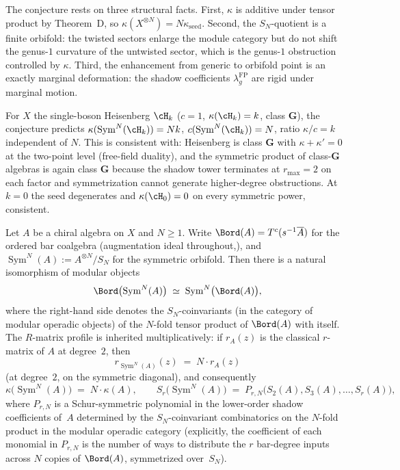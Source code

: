 \begin{remark}
\label{rem:orbifold-agreement-motivation}
The conjecture rests on three structural facts. First,
$\kappa$ is additive under tensor product by Theorem~D, so
$\kappa(X^{\otimes N}) = N \kappa_{\mathrm{seed}}$. Second,
the $S_N$-quotient is a finite orbifold: the twisted sectors
enlarge the module category but do not shift the
genus-$1$ curvature of the untwisted sector, which is the
genus-$1$ obstruction controlled by $\kappa$. Third, the
enhancement from generic to orbifold point is an exactly
marginal deformation: the shadow coefficients
$\lambda_g^{\mathrm{FP}}$ are rigid under marginal motion.

For $X$ the single-boson Heisenberg $\cH_k$ ($c = 1$,
$\kappa(\cH_k) = k$, class $\mathbf{G}$), the conjecture predicts
$\kappa(\operatorname{Sym}^N(\cH_k)) = Nk$,
$c(\operatorname{Sym}^N(\cH_k)) = N$, ratio
$\kappa/c = k$ independent of $N$. This is consistent with: Heisenberg is class $\mathbf{G}$ with
$\kappa + \kappa' = 0$ at the two-point level (free-field
duality), and the symmetric product of class-$\mathbf{G}$
algebras is again class $\mathbf{G}$ because the shadow
tower terminates at $r_{\max} = 2$ on each factor and
symmetrization cannot generate higher-degree obstructions.
At $k = 0$ the seed degenerates and $\kappa(\cH_0) = 0$ on
every symmetric power, consistent.
\end{remark}

\begin{proposition}
\label{prop:bar-sym-n-synthesis}
Let $A$ be a chiral algebra on $X$ and $N \geq 1$. Write
$\Bord(A) = T^c(s^{-1}\overline{A})$ for the ordered bar
coalgebra (augmentation ideal throughout,), and
$\operatorname{Sym}^N(A) := A^{\otimes N} / S_N$ for the
symmetric orbifold. Then there is a natural isomorphism of
modular objects
\[
 \Bord\bigl(\operatorname{Sym}^N(A)\bigr)
 \;\simeq\; \operatorname{Sym}^N\bigl(\Bord(A)\bigr),
\]
where the right-hand side denotes the $S_N$-coinvariants
(in the category of modular operadic objects) of the
$N$-fold tensor product of $\Bord(A)$ with itself. The
$R$-matrix profile is inherited multiplicatively: if $r_A(z)$
is the classical $r$-matrix of $A$ at degree~$2$, then
\[
 r_{\operatorname{Sym}^N(A)}(z)
 \;=\; N \cdot r_A(z)
\]
(at degree~$2$, on the symmetric diagonal), and consequently
\[
 \kappa\bigl(\operatorname{Sym}^N(A)\bigr)
 \;=\; N \cdot \kappa(A),
 \qquad
 S_r\bigl(\operatorname{Sym}^N(A)\bigr)
 \;=\; P_{r,N}\bigl(S_2(A), S_3(A), \ldots, S_r(A)\bigr),
\]
where $P_{r,N}$ is a Schur-symmetric polynomial in the
lower-order shadow coefficients of~$A$ determined by the
$S_N$-coinvariant combinatorics on the $N$-fold product in
the modular operadic category (explicitly, the coefficient
of each monomial in $P_{r,N}$ is the number of ways to
distribute the $r$ bar-degree inputs across $N$ copies of
$\Bord(A)$, symmetrized over~$S_N$).
\end{proposition}

